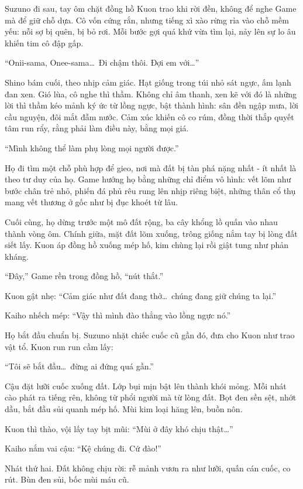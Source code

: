 \documentclass[../main.tex]{subfiles}
\begin{document}
Suzuno đi sau, tay ôm chặt đồng hồ Kuon trao khi rời đền, không để nghe Game mà để giữ chỗ dựa. Cô vốn cứng rắn, nhưng tiếng xì xào rừng rỉa vào chỗ mềm yếu: nỗi sợ bị quên, bị bỏ rơi. Mỗi bước gợi quá khứ vừa tìm lại, nảy lên sự lo âu khiến tim cô đập gấp.

``Onii-sama, Onee-sama\dots\ Đi chậm thôi. Đợi em với\dots''

Shino bám cuối, theo nhịp cảm giác. Hạt giống trong túi nhỏ sát ngực, ấm lạnh đan xen. Gió lùa, cô nghe thì thầm. Không chỉ âm thanh, xen kẽ với đó là những lời thì thầm kéo mảnh ký ức từ lồng ngực, bật thành hình: sân đền ngập mưa, lời cầu nguyện, đôi mắt đẫm nước. Cảm xúc khiến cô co rúm, đồng thời thắp quyết tâm run rẩy, rằng phải làm điều này, bằng mọi giá.

``Mình không thể làm phụ lòng mọi người được.''

Họ đi tìm một chỗ phù hợp để gieo, nơi mà đất bị tàn phá nặng nhất - ít nhất là theo tư duy của họ. Game hướng họ bằng những chỉ điểm vô hình: vết lõm như bước chân trẻ nhỏ, phiến đá phủ rêu rung lên nhịp riêng biệt, những thân cổ thụ mang vết thương ở gốc như bị đục khoét từ lâu.

Cuối cùng, họ dừng trước một mô đất rộng, ba cây khổng lồ quấn vào nhau thành vòng ôm. Chính giữa, mặt đất lõm xuống, trông giống nắm tay bị lòng đất siết lấy. Kuon áp đồng hồ xuống mép hố, kim chùng lại rồi giật tung như phản kháng.

``Đây,'' Game rền trong đồng hồ, ``nút thắt.''

Kuon gật nhẹ: ``Cảm giác như đất đang thở\dots\ chúng đang giữ chúng ta lại.''

Kaiho nhếch mép: ``Vậy thì mình đào thẳng vào lồng ngực nó.''

Họ bắt đầu chuẩn bị. Suzuno nhặt chiếc cuốc cũ gần đó, đưa cho Kuon như trao vật tổ. Kuon run run cầm lấy:

``Tôi sẽ bắt đầu\dots\ đừng ai đứng quá gần.''

Cậu đặt lưỡi cuốc xuống đất. Lớp bụi mịn bật lên thành khói mỏng. Mỗi nhát cào phát ra tiếng rên, không từ phổi người mà từ lòng đất. Bọt đen sền sệt, nhớt dầu, bắt đầu sủi quanh mép hố. Mùi kim loại hăng lên, buồn nôn.

Kuon thì thào, vội lấy tay bịt mũi: ``Mùi ở đây khó chịu thật\dots''

Kaiho nắm vai cậu: ``Kệ chúng đi. Cứ đào!''

Nhát thứ hai. Đất không chịu rời: rễ mảnh vươn ra như lưỡi, quấn cán cuốc, co rút. Bùn đen sủi, bốc mùi máu cũ.
\end{document}
